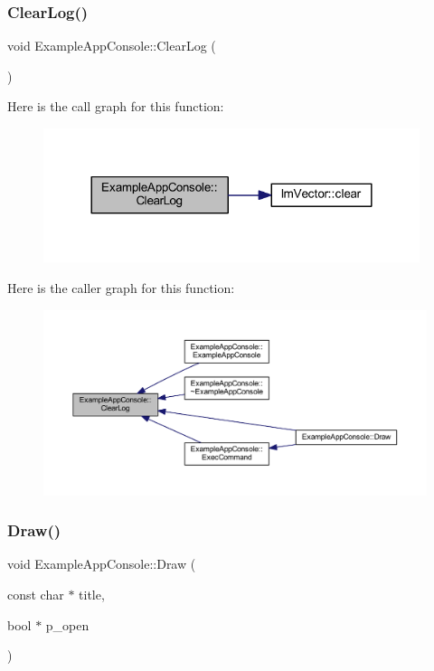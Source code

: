 \subsubsection{\texorpdfstring{Clear\+Log()}{ClearLog()}}
{\footnotesize\ttfamily void Example\+App\+Console\+::\+Clear\+Log (\begin{DoxyParamCaption}{ }\end{DoxyParamCaption})\hspace{0.3cm}{\ttfamily [inline]}}

Here is the call graph for this function\+:
\nopagebreak
\begin{figure}[H]
\begin{center}
\leavevmode
\includegraphics[width=312pt]{struct_example_app_console_a2ef13f00c474b16b8da2ec062d5e5cc2_cgraph}
\end{center}
\end{figure}
Here is the caller graph for this function\+:
\nopagebreak
\begin{figure}[H]
\begin{center}
\leavevmode
\includegraphics[width=350pt]{struct_example_app_console_a2ef13f00c474b16b8da2ec062d5e5cc2_icgraph}
\end{center}
\end{figure}
\mbox{\label{struct_example_app_console_a0518a09c7e8648dd52c7c06df19ac17a}} 
\subsubsection{\texorpdfstring{Draw()}{Draw()}}
{\footnotesize\ttfamily void Example\+App\+Console\+::\+Draw (\begin{DoxyParamCaption}\item[{const char $\ast$}]{title,  }\item[{bool $\ast$}]{p\+\_\+open }\end{DoxyParamCaption})\hspace{0.3cm}{\ttfamily [inline]}}

